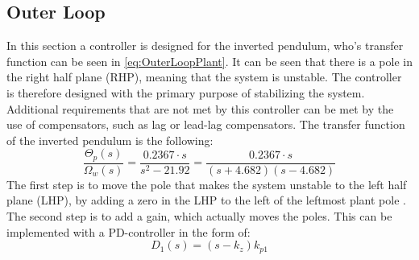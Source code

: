 \subsection{Outer Loop}
In this section a controller is designed for the inverted pendulum, who's transfer function can be seen in \autoref{eq:OuterLoopPlant}. It can be seen that there is a pole in the right half plane (RHP), meaning that the system is unstable. The controller is therefore designed with the primary purpose of stabilizing the system. Additional requirements that are not met by this controller can be met by the use of compensators, such as lag or lead-lag compensators. \newpage
The transfer function of the inverted pendulum is the following:
\begin{equation}
\frac{\Theta_p(s)}{\Omega_w(s)}=\frac{0.2367\cdot s}{s^2 - 21.92} = \frac{0.2367 \cdot s}{(s + 4.682)(s - 4.682)}\label{eq:OuterLoopPlant}
\end{equation}
The first step is to move the pole that makes the system unstable to the left half plane (LHP), by adding a zero in the LHP to the left of the leftmost plant pole \citep[p. 273]{sou:Feedback}. The second step is to add a gain, which actually moves the poles. This can be implemented with a PD-controller in the form of:
\begin{equation}
D_1(s) = (s - k_z)k_{p1}
\end{equation}
\begin{where}
\\
\\
\end{where} 
\vspace{-0.5 cm}

